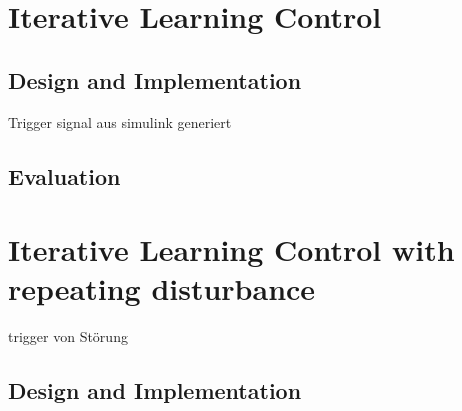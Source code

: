 




\section{Iterative Learning Control}
\subsection{Design and Implementation}
Trigger signal aus simulink generiert
\subsection{Evaluation}

\section{Iterative Learning Control with repeating disturbance}
trigger von Störung
\subsection{Design and Implementation}

